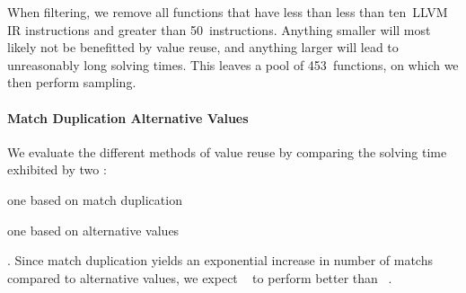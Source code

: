 When filtering, we remove all \glspl{function} that have less than less
than ten~\gls{LLVM} \gls{IR} \glspl{instruction} and greater than
\num{50}~\glspl{instruction}.
%
Anything smaller will most likely not be benefitted by \gls{value reuse}, and
anything larger will lead to unreasonably long solving times.
%
This leaves a pool of \num{453}~\glspl{function}, on which we then perform
sampling.


\paragraph{Match Duplication \versus Alternative Values}

We evaluate the different methods of \gls{value reuse} by comparing the solving
time exhibited by two :
%
\begin{modelList}
  \item {}
    one based on \gls{match duplication}
  \item {}
    one based on \glspl{alternative value}
\end{modelList}.
%
Since \gls{match duplication} yields an exponential increase in number of
\glspl{match} compared to \glspl{alternative value}, we expect
~ to perform better than
~.



